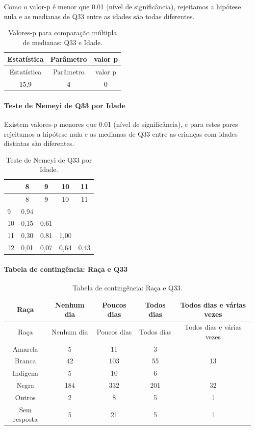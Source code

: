 \documentclass[]{article}
\let\oldparagraph\paragraph
\renewcommand{\paragraph}[1]{\oldparagraph{#1}\mbox{}}
\begin{document}
Como o valor-p é menor que 0.01 (nível de significância), rejeitamos a hipótese nula e as medianas de Q33 entre as idades são todas diferentes.

\begin{longtable}[]{@{}ccc@{}}
\caption{\label{tab:unnamed-chunk-1161}Valores-p para comparação múltipla de medianas: Q33 e Idade.}\tabularnewline
\toprule
Estatística & Parâmetro & valor p\tabularnewline
\midrule
\endfirsthead
\toprule
Estatística & Parâmetro & valor p\tabularnewline
\midrule
\endhead
15,9 & 4 & 0\tabularnewline
\bottomrule
\end{longtable}

\hypertarget{teste-de-nemeyi-de-q33-por-idade}{%
\paragraph{Teste de Nemeyi de Q33 por Idade}\label{teste-de-nemeyi-de-q33-por-idade}}

Existem valores-p menores que 0.01 (nível de significância), e para estes pares rejeitamos a hipótese nula e as medianas de Q33 entre as crianças com idades distintas são diferentes.

\begin{longtable}[]{@{}lcccc@{}}
\caption{\label{tab:unnamed-chunk-1163}Teste de Nemeyi de Q33 por Idade.}\tabularnewline
\toprule
& 8 & 9 & 10 & 11\tabularnewline
\midrule
\endfirsthead
\toprule
& 8 & 9 & 10 & 11\tabularnewline
\midrule
\endhead
9 & 0,94 & & &\tabularnewline
10 & 0,15 & 0,61 & &\tabularnewline
11 & 0,30 & 0,81 & 1,00 &\tabularnewline
12 & 0,01 & 0,07 & 0,64 & 0,43\tabularnewline
\bottomrule
\end{longtable}

\cleardoublepage

\hypertarget{tabela-de-continguxeancia-rauxe7a-e-q33}{%
\paragraph{Tabela de contingência: Raça e Q33}\label{tabela-de-continguxeancia-rauxe7a-e-q33}}

\begin{longtable}[]{@{}ccccc@{}}
\caption{\label{tab:unnamed-chunk-1164}Tabela de contingência: Raça e Q33.}\tabularnewline
\toprule
Raça & Nenhum dia & Poucos dias & Todos dias & Todos dias e várias vezes\tabularnewline
\midrule
\endfirsthead
\toprule
Raça & Nenhum dia & Poucos dias & Todos dias & Todos dias e várias vezes\tabularnewline
\midrule
\endhead
Amarela & 5 & 11 & 3 &\tabularnewline
Branca & 42 & 103 & 55 & 13\tabularnewline
Indígena & 5 & 10 & 6 &\tabularnewline
Negra & 184 & 332 & 201 & 32\tabularnewline
Outros & 2 & 8 & 5 & 1\tabularnewline
Sem resposta & 5 & 21 & 5 & 1\tabularnewline
\bottomrule
\end{longtable}
\end{document}
